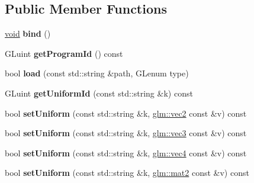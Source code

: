 \subsection*{Public Member Functions}
\begin{DoxyCompactItemize}
\item 
\hypertarget{classgdl_1_1_a_shader_a51ce5fd5c2f0afcda913a44ab68ab32b}{}\hyperlink{_s_d_l__audio_8h_a52835ae37c4bb905b903cbaf5d04b05f}{void} {\bfseries bind} ()\label{classgdl_1_1_a_shader_a51ce5fd5c2f0afcda913a44ab68ab32b}

\item 
\hypertarget{classgdl_1_1_a_shader_af1ed529201e3a16301b3ab0f6d592d54}{}G\+Luint {\bfseries get\+Program\+Id} () const \label{classgdl_1_1_a_shader_af1ed529201e3a16301b3ab0f6d592d54}

\item 
\hypertarget{classgdl_1_1_a_shader_ae292aeb4a9ebf03d2427ba9f44d50136}{}bool {\bfseries load} (const std\+::string \&path, G\+Lenum type)\label{classgdl_1_1_a_shader_ae292aeb4a9ebf03d2427ba9f44d50136}

\item 
\hypertarget{classgdl_1_1_a_shader_a291f4bb70e4374b8a081a57a21e1fe28}{}G\+Luint {\bfseries get\+Uniform\+Id} (const std\+::string \&k) const \label{classgdl_1_1_a_shader_a291f4bb70e4374b8a081a57a21e1fe28}

\item 
\hypertarget{classgdl_1_1_a_shader_ae71efb1e61476a56eb5d4fec32d5d1fa}{}bool {\bfseries set\+Uniform} (const std\+::string \&k, \hyperlink{group__core__types_ga66d091b759687504ab01365fbd33a1dd}{glm\+::vec2} const \&v) const \label{classgdl_1_1_a_shader_ae71efb1e61476a56eb5d4fec32d5d1fa}

\item 
\hypertarget{classgdl_1_1_a_shader_a4cfe07c7cacb131d08053b2999b3135f}{}bool {\bfseries set\+Uniform} (const std\+::string \&k, \hyperlink{group__core__types_gad45787527c6ff2bd6680867204eb0354}{glm\+::vec3} const \&v) const \label{classgdl_1_1_a_shader_a4cfe07c7cacb131d08053b2999b3135f}

\item 
\hypertarget{classgdl_1_1_a_shader_a2ce35c4336139492a98df3db8bdd18d1}{}bool {\bfseries set\+Uniform} (const std\+::string \&k, \hyperlink{group__core__types_gae9c89157f980f7247cdee8bf55787035}{glm\+::vec4} const \&v) const \label{classgdl_1_1_a_shader_a2ce35c4336139492a98df3db8bdd18d1}

\item 
\hypertarget{classgdl_1_1_a_shader_a183eb89b2c0f2dc8139c33ff406d7c07}{}bool {\bfseries set\+Uniform} (const std\+::string \&k, \hyperlink{group__core__types_ga8357ec0aab6f8cf69313592492663c3f}{glm\+::mat2} const \&v) const \label{classgdl_1_1_a_shader_a183eb89b2c0f2dc8139c33ff406d7c07}


\end{DoxyCompactItemize}
